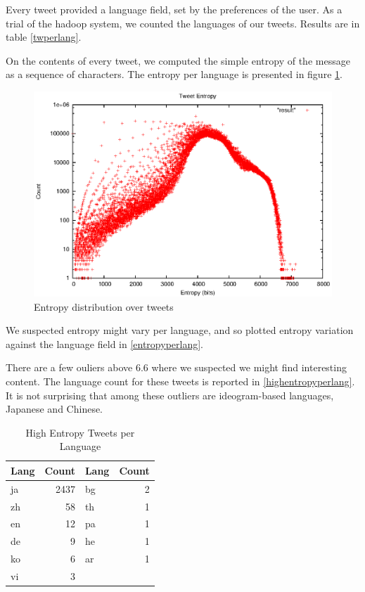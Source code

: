 \documentclass[a4paper,11pt]{article}
\begin{document}
Every tweet provided a language field, set by the preferences of the user. As a trial of the hadoop system, we counted the languages of our tweets. Results are in table \ref{twperlang}.

On the contents of every tweet, we computed the simple entropy of the message as a sequence of characters. The entropy per language is presented in figure \ref{entropy}.

\begin{figure}
\centering
\includegraphics{text-entropy/result.eps}
\caption{Entropy distribution over tweets}
\label{entropy}
\end{figure}

We suspected entropy might vary per language, and so plotted entropy variation against the language field in \ref{entropyperlang}.


There are a few ouliers above 6.6 where we suspected we might find interesting content. The language count for these tweets is reported in \ref{highentropyperlang}. It is not surprising that among these outliers are ideogram-based languages, Japanese and Chinese.

\begin{table}
\centering
\begin{tabular}{|l|r||l|r|}
\hline
Lang & Count & Lang & Count \\
\hline
ja  & 2437 &  bg  &    2 \\
zh  & 58 & th   &   1 \\
en   &   12  & pa  &    1 \\
de   &   9 &   he  &    1 \\
ko    &  6 &  ar   &   1 \\
vi   &   3 & & \\
\hline
\end{tabular}
\caption{High Entropy Tweets per Language}
\end{table}
\end{document}
